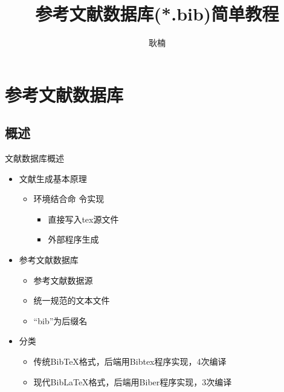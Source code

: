 \documentclass[fontset = none, t]{ctexbeamer}
\title[文献数据库]{\LARGE 参考文献数据库(*.bib)简单教程}
\author[N. Geng]{耿楠}
\institute[教发中心]{西北农林科技大学教学发展中心}
\date{\tosemester}
\begin{document}
\maketitle
\section[文献数据库]{参考文献数据库}
\subsection[概述]{概述}
\begin{frame}{文献数据库}{概述}
  \begin{spacing}{1.5}
    \begin{itemize}
    \item 文献生成基本原理
      \begin{itemize}
      \item \texinline{\thebibliography}环境结合\texinline{\bibitem}命
        令实现
        \begin{itemize}
        \item 直接写入tex源文件
        \item 外部程序生成
        \end{itemize}
      \end{itemize}
    \item 参考文献数据库
      \begin{itemize}
      \item 参考文献数据源
      \item 统一规范的\alert{文本文件}
      \item \enquote{\alert{bib}}为后缀名
      \end{itemize}
    \item 分类
      \begin{itemize}
      \item 传统Bib\TeX 格式，后端用Bibtex程序实现，4次编译
      \item 现代Bib\LaTeX 格式，后端用Biber程序实现，3次编译
      \end{itemize}
    \end{itemize}
  \end{spacing}
\end{frame}
\end{document}
